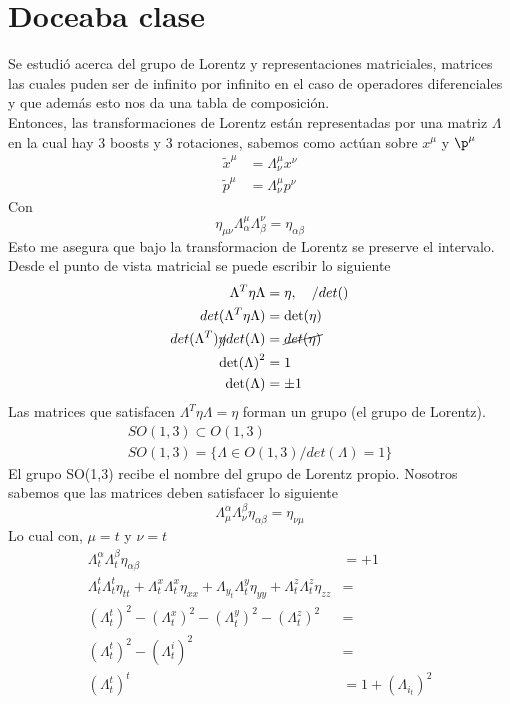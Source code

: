 \documentclass[../main.tex]{subfiles}
\begin{document}
\section{Doceaba clase}
Se estudió acerca del grupo de Lorentz y representaciones matriciales, matrices las cuales puden ser de infinito por infinito en el caso de operadores diferenciales y que además esto nos da una tabla de composición. \\
Entonces, las transformaciones de Lorentz están representadas por una matriz $\Lambda$ en la cual hay 3 boosts y 3 rotaciones, sabemos como actúan sobre $x^\mu$ y $\p^\mu$
\begin{align*}
  \tilde{x}^\mu & = \Lambda^\mu_\nu x^\nu \\
  \tilde{p}^\mu & =  \Lambda^\mu_\nu p^\nu
\end{align*}
Con
\begin{equation*}
  \eta_{\mu \nu}\Lambda^\mu_\alpha \Lambda_\beta^\nu = \eta_{\alpha \beta}
\end{equation*}
Esto me asegura que bajo la transformacion de Lorentz se preserve el intervalo. Desde el punto de vista matricial se puede escribir lo siguiente
\begin{align*}
  \Lambda^T \eta \Lambda & = \eta, \quad /det() \\
  det(\Lambda^T\eta \Lambda) & = \det(\eta) \\
  det(\Lambda^T)\cancel{\eta}det(\Lambda) & = \cancel{det(\eta)} \\
  \det(\Lambda)^2 & = 1 \\
  \det(\Lambda) & = \pm 1
\end{align*}
Las matrices que satisfacen $\Lambda^T \eta \Lambda = \eta$ forman un grupo (el grupo de Lorentz). 
\begin{align*}
  SO(1,3) \subset O(1,3) \\
  SO(1,3) = \{\Lambda \in O(1,3)/ det(\Lambda)=1\}
\end{align*}
El grupo SO(1,3) recibe el nombre del grupo de Lorentz propio. Nosotros sabemos que las matrices deben satisfacer lo siguiente
\begin{equation*}
  \Lambda^\alpha_\mu \Lambda^\beta_\nu \eta_{\alpha \beta} = \eta_{\nu \mu}
\end{equation*}
Lo cual con, $\mu=t$ y $\nu=t$
\begin{align*}
  \Lambda^\alpha_t\Lambda^\beta_t \eta_{\alpha \beta} & = +1 \\
  \Lambda^t_t \Lambda^t_t \eta_{tt} + \Lambda^x_t \Lambda^x_t \eta_{xx} + \Lambda_y_t\Lambda^y_t \eta_{yy} + \Lambda^z_t\Lambda^z_t \eta_{zz} & = \\
  \left( \Lambda^t_t \right)^2 - \left( \Lambda^x_t \right)^2 - \left( \Lambda^y_t \right)^2 - \left( \Lambda_t^z \right)^2 & = \\
  \left( \Lambda_t^t \right)^2 - \left( \Lambda^i_t \right)^2 & = \\
  \left( \Lambda_t^t \right)^t & = 1 + \left( \Lambda_i_t \right)^2
\end{align*}
\end{document}
